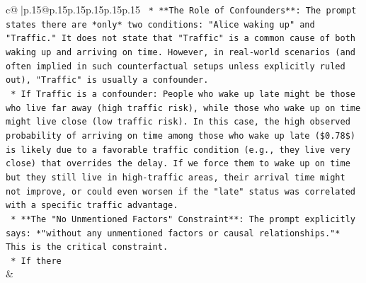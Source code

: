 \documentclass{article}
\begin{document}
{\begin{supertabular}{c@{$\;$}|p{.15\linewidth}@{}p{.15\linewidth}p{.15\linewidth}p{.15\linewidth}p{.15\linewidth}p{.15\linewidth}}
{{{\texttt{    *   **The Role of Confounders**: The prompt states there are *only* two conditions: "Alice waking up" and "Traffic." It does not state that "Traffic" is a common cause of both waking up and arriving on time. However, in real{-}world scenarios (and often implied in such counterfactual setups unless explicitly ruled out), "Traffic" is usually a confounder.} \\
\texttt{        *   If Traffic is a confounder: People who wake up late might be those who live far away (high traffic risk), while those who wake up on time might live close (low traffic risk). In this case, the high observed probability of arriving on time among those who wake up late (\$0.78\$) is likely due to a favorable traffic condition (e.g., they live very close) that overrides the delay. If we force them to wake up on time but they still live in high{-}traffic areas, their arrival time might not improve, or could even worsen if the "late" status was correlated with a specific traffic advantage.} \\
\texttt{    *   **The "No Unmentioned Factors" Constraint**: The prompt explicitly says: *"without any unmentioned factors or causal relationships."* This is the critical constraint.} \\
\texttt{        *   If there} \\
            }
        }
    }
    & \\ \\


\end{supertabular}}
\end{document}
